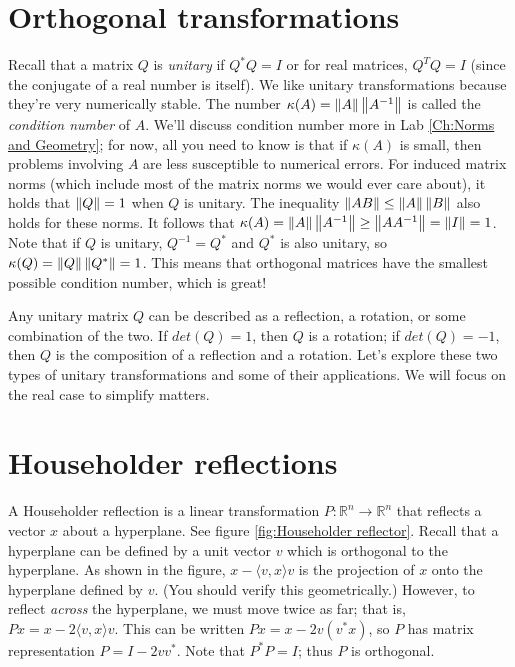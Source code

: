 \label{Ch:Canonical Transformations}


\section*{Orthogonal transformations}
Recall that a matrix $Q$ is \emph{unitary} if $Q^* Q = I$ or for real matrices, 
$Q^T Q = I$ (since the conjugate of a real number is itself). 
We like unitary transformations because they're very numerically stable. 
The number $\kappa(A) = \left\lVert A\right\rVert \left\lVert A^{-1}\right\rVert$ is called the \emph{condition number} of $A$. 
We'll discuss condition number more in Lab \ref{Ch:Norms and Geometry}; for now, all you need to know is that if $\kappa(A)$ is small, then problems involving $A$ are less susceptible to numerical errors. 
For induced matrix norms (which include most of the matrix norms we would ever care about), it holds that $\left\lVert Q\right\rVert=1$ when $Q$ is unitary. 
The inequality $\left\lVert AB\right\rVert \leq \left\lVert A\right\rVert \left\lVert B\right\rVert$ also holds for these norms. 
It follows that $\kappa(A) = \left\lVert A\right\rVert \left\lVert A^{-1}\right\rVert \geq \left\lVert A A^{-1}\right\rVert = \left\lVert I\right\rVert = 1$.
Note that if $Q$ is unitary, $Q^{-1} = Q^*$ and $Q^*$ is also unitary, so $\kappa(Q) = \left\lVert Q\right\rVert \left\lVert Q^*\right\rVert = 1$. 
This means that orthogonal matrices have the smallest possible condition number, which is great!

Any unitary matrix $Q$ can be described as a reflection, a rotation, or some combination of the two. 
If $det(Q) = 1$, then $Q$ is a rotation; if $det(Q) = -1$, then $Q$  is the composition of a reflection and a rotation.
Let's explore these two types of unitary transformations and some of their applications.
We will focus on the real case to simplify matters.

\section*{Householder reflections}
A Householder reflection is a linear transformation $P: \mathbb{R}^n \rightarrow \mathbb{R}^n$ that reflects a vector $x$ about a hyperplane. 
See figure \ref{fig:Householder reflector}. Recall that a hyperplane can be defined by a unit vector $v$ which is orthogonal to the hyperplane.
As shown in the figure, $x - \langle v,x \rangle v$ is the projection of $x$ onto the hyperplane defined by $v$.
(You should verify this geometrically.) However, to reflect \emph{across} the hyperplane, we must move twice as far; that is, $Px = x - 2\langle v,x \rangle v$. 
This can be written $Px = x - 2v(v^\ast x)$, so $P$ has matrix representation $P = I - 2vv^\ast$. Note that $P^\ast P = I$; thus $P$ is orthogonal.

